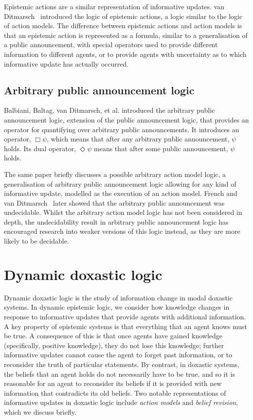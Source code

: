 Epistemic actions are a similar representation of informative updates.
van
Ditmarsch~\cite{vanditmarsch1999logic,vanditmarsch2001knowledge,vanditmarsch2007dynamic}
introduced the logic of epistemic actions, a logic similar to the logic of
action models. The difference between epistemic actions and action models is
that an epistemic action is represented as a formula, similar to a
generalisation of a public announcement, with special operators used to provide
different information to different agents, or to provide agents with uncertainty
as to which informative update has actually occurred.

\subsection{Arbitrary public announcement logic}

Balbiani, Baltag, van Ditmarsch, et al.\cite{balbiani2007arbitrary} introduced
the arbitrary public announcement logic, extension of the public announcement
logic, that provides an operator for quantifying over arbitrary public
announcements. It introduces an operator, $\Box\psi$, which means that after
any arbitrary public announcement, $\psi$ holds. Its dual operator,
$\Diamond\psi$ means that after some public announcement, $\psi$ holds.

The same paper briefly discusses a possible arbitrary action model logic, a
generalisation of arbitrary public announcement logic allowing for any kind of
informative update, modelled as the execution of an action model. French and
van Ditmarsch~\cite{french2008undecidability} later showed that the arbitrary
public announcement was undecidable. Whilst the arbitrary action model logic has
not been considered in depth, the undecidability result in arbitrary public
announcement logic has encouraged research into weaker versions of this logic
instead, as they are more likely to be decidable.

\section{Dynamic doxastic logic}

Dynamic doxastic logic is the study of information change in modal doxastic
systems. In dynamic epistemic logic, we consider how knowledge changes in
response to informative updates that provide agents with additional information.
A key property of epistemic systems is that everything that an agent knows must
be true. A consequence of this is that once agents have gained knowledge
(specifically, positive knowledge), they do not lose this knowledge; further
informative updates cannot cause the agent to forget past information, or to
reconsider the truth of particular statements. By contrast, in doxastic systems,
the beliefs that an agent holds do not necessarily have to be true, and so it is
reasonable for an agent to reconsider its beliefs if it is provided with new
information that contradicts its old beliefs. Two notable representations of
informative updates in doxastic logic include {\em action models} and {\em
belief revision}, which we discuss briefly.

